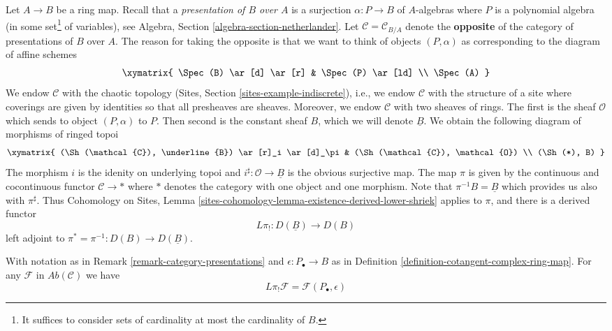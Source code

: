 \begin{remark}
\label{remark-category-presentations}
Let $A \to B$ be a ring map. Recall that a {\it presentation of $B$ over $A$}
is a surjection $\alpha : P \to B$ of $A$-algebras where $P$ is a polynomial
algebra (in some set\footnote{It suffices to consider sets of cardinality
at most the cardinality of $B$.} of variables), see
Algebra, Section \ref{algebra-section-netherlander}.
Let $\mathcal{C} = \mathcal{C}_{B/A}$ denote the {\bf opposite}
of the category of presentations of $B$ over $A$. The reason for
taking the opposite is that we want to think of objects
$(P, \alpha)$ as corresponding to the diagram of affine schemes
$$
\xymatrix{
\Spec(B) \ar[d] \ar[r] & \Spec(P) \ar[ld] \\
\Spec(A)
}
$$
We endow $\mathcal{C}$ with the chaotic topology
(Sites, Section \ref{sites-example-indiscrete}), i.e., we endow
$\mathcal{C}$ with the structure of a site where coverings are given by
identities so that all presheaves are sheaves.
Moreover, we endow $\mathcal{C}$ with two sheaves of rings. The first
is the sheaf $\mathcal{O}$ which sends to object $(P, \alpha)$ to $P$.
Then second is the constant sheaf $B$, which we will denote
$\underline{B}$. We obtain the following diagram of morphisms of
ringed topoi
$$
\xymatrix{
(\Sh(\mathcal{C}), \underline{B}) \ar[r]_i \ar[d]_\pi &
(\Sh(\mathcal{C}), \mathcal{O}) \\
(\Sh(*), B)
}
$$
The morphism $i$ is the idenity on underlying topoi and
$i^\sharp : \mathcal{O} \to \underline{B}$ is the obvious surjective map.
The map $\pi$ is given by the continuous and cocontinuous functor
$\mathcal{C} \to *$ where $*$ denotes the category with one
object and one morphism. Note that $\pi^{-1}B = \underline{B}$
which provides us also with $\pi^\sharp$. Thus
Cohomology on Sites, Lemma
\ref{sites-cohomology-lemma-existence-derived-lower-shriek}
applies to $\pi$, and there is a derived functor
$$
L\pi_! : D(\underline{B}) \longrightarrow D(B)
$$
left adjoint to $\pi^* = \pi^{-1} : D(B) \to D(\underline{B})$.
\end{remark}

\begin{lemma}
\label{lemma-identify-pi-shriek}
With notation as in Remark \ref{remark-category-presentations}
and $\epsilon : P_\bullet \to B$ as in
Definition \ref{definition-cotangent-complex-ring-map}.
For any $\mathcal{F}$ in $\textit{Ab}(\mathcal{C})$ we have
$$
L\pi_!\mathcal{F} = \mathcal{F}(P_\bullet, \epsilon)
$$
\end{lemma}

